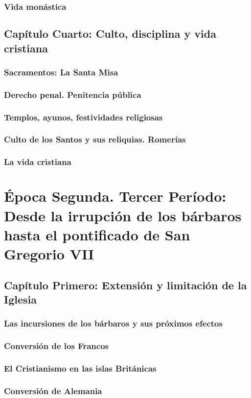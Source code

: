 \raggedbottom{} \documentclass[12pt, a4paper]{book}
\begin{document}
\section{Vida monástica}
\chapter{Capítulo Cuarto: Culto, disciplina y vida cristiana}
\section{Sacramentos: La Santa Misa}
\section{Derecho penal. Penitencia pública}
\section{Templos, ayunos, festividades religiosas}
\section{Culto de los Santos y sus reliquias. Romerías}
\section{La vida cristiana}
\part{Época Segunda. Tercer Período: Desde la irrupción de los bárbaros hasta el pontificado de San Gregorio VII}
\chapter{Capítulo Primero: Extensión y limitación de la Iglesia}
\section{Las incursiones de los bárbaros y sus próximos efectos}
\section{Conversión de los Francos}
\section{El Cristianismo en las islas Británicas}
\section{Conversión de Alemania}
\end{document}

